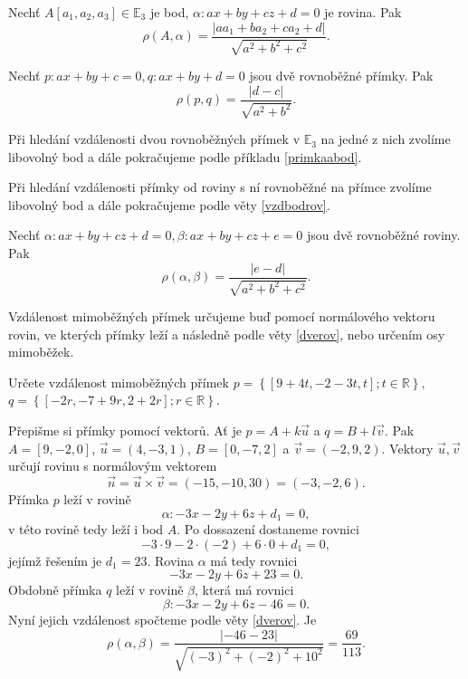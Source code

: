 \begin{veta}\label{vzdbodrov}
    Nechť $A[a_1,a_2,a_3]\in \mathbb E_3$ je bod, $\alpha\colon ax+by+cz+d=0$ je rovina. Pak
    $$\rho(A,\alpha)=\frac{|aa_1+ba_2+ca_2+d|}{\sqrt{a^2+b^2+c^2} }.$$
\end{veta}

\begin{veta}\label{vzdpr}
    Nechť $p\colon ax+by+c=0,q\colon ax+by+d=0$ jsou dvě rovnoběžné přímky. Pak
    $$\rho(p,q)=\frac{|d-c|}{\sqrt{a^2+b^2} }.$$
\end{veta}

\begin{pozn}
    Při hledání vzdálenosti dvou rovnoběžných přímek v $\mathbb E_3$ na jedné z nich zvolíme
    libovolný bod a dále pokračujeme podle příkladu \ref{primkaabod}.
\end{pozn}

\begin{pozn}
    Při hledání vzdálenosti přímky od roviny s ní rovnoběžné na přímce zvolíme
    libovolný bod a dále pokračujeme podle věty \ref{vzdbodrov}.
\end{pozn}

\begin{veta}\label{dverov}
    Nechť $\alpha\colon ax+by+cz+d=0,\beta\colon ax+by+cz+e=0$ jsou dvě rovnoběžné roviny. Pak
    $$\rho(\alpha,\beta)=\frac{|e-d|}{\sqrt{a^2+b^2+c^2} }.$$
\end{veta}

\begin{pozn}
    Vzdálenost mimoběžných přímek určujeme buď pomocí normálového vektoru rovin,
    ve kterých přímky leží a následně podle věty \ref{dverov}, nebo určením
    osy mimoběžek.
\end{pozn}

\begin{priklad}
Určete vzdálenost mimoběžných přímek $p=\left \{ [9+4t,-2-3t,t]; t \in \mathbb R \right \},$ $q=\left \{ [-2r,-7+9r,2+2r]; r \in \mathbb R \right \} $.
\end{priklad}

\begin{reseni}
Přepišme si přímky pomocí vektorů. Ať je $p=A+ k\vec u$ a $q=B+l\vec v$. Pak $A = [9,-2,0]$, $\vec u = (4,-3,1)$,
$B=[0,-7,2]$ a $\vec v = (-2,9,2)$. Vektory $\vec u, \vec v$ určují rovinu s normálovým vektorem
$$
    \vec n = \vec u \times \vec v = (-15,-10,30)=(-3,-2,6).
$$
Přímka $p$ leží v rovině
$$
    \alpha\colon -3x -2y +6z + d_1 = 0,
$$
v této rovině tedy leží i bod $A$. Po dossazení dostaneme rovnici
$$
    -3 \cdot 9 -2 \cdot(-2) + 6\cdot 0 + d_1 = 0,
$$
jejímž řešením je $d_1 = 23$.
Rovina $\alpha$ má tedy rovnici
$$
    -3x -2y +6z + 23 = 0.
$$
Obdobně přímka $q$ leží v rovině $\beta$, která má rovnici
$$
    \beta\colon -3x -2y +6z - 46 = 0.
$$
Nyní jejich vzdálenost spočteme podle věty \ref{dverov}. Je
$$
    \rho(\alpha, \beta) = \frac{|-46-23|}{\sqrt{(-3)^2+(-2)^2+10^2}} = \frac{69}{113}.
$$
\end{reseni}

